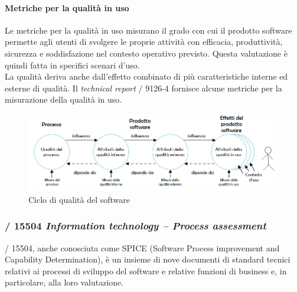   \paragraph{Metriche per la qualità in uso}
    Le metriche per la qualità in uso misurano il grado con cui il prodotto software permette agli utenti di svolgere le proprie attività con efficacia, produttività, sicurezza e soddisfazione nel contesto operativo previsto.
    Questa valutazione è quindi fatta in specifici scenari d'uso.\\
    La qualità deriva anche dall'effetto combinato di più caratteristiche interne ed esterne di qualità.
    Il \emph{technical report} / 9126-4 fornisce alcune metriche per la misurazione della qualità in uso.

  \begin{figure}
    \includegraphics[width=1\textwidth]{res/sections/img/qdps.png}
    \caption{Ciclo di qualità del software}
    \centering
    \label{}
  \end{figure}


  \subsubsection{/ 15504 \emph{Information technology – Process assessment}}

  / 15504, anche conosciuta come SPICE (Software Process improvement and Capability Determination),
  è un insieme di nove documenti di standard tecnici relativi ai processi di sviluppo del software e relative funzioni di business e, in particolare, alla loro valutazione.

